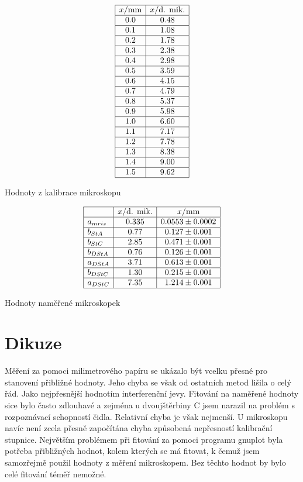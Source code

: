 \documentclass[a4paper,12pt]{article}
\begin{document}
\begin{table}
$$
\begin{array}{|c|c|}
\hline
x/\mbox{mm}& x/\mbox{d. mik.} \\ \hline
0.0&    0.48 \\ \hline
0.1&    1.08 \\ \hline
0.2&    1.78 \\ \hline
0.3&    2.38 \\ \hline
0.4&    2.98 \\ \hline
0.5&    3.59 \\ \hline
0.6&    4.15 \\ \hline
0.7&    4.79 \\ \hline
0.8&    5.37 \\ \hline
0.9&    5.98 \\ \hline
1.0&    6.60 \\ \hline
1.1&    7.17 \\ \hline
1.2&    7.78 \\ \hline
1.3&    8.38 \\ \hline
1.4&    9.00 \\ \hline
1.5&    9.62 \\ \hline
\end{array}
$$
\caption{Hodnoty z kalibrace mikroskopu}
\label{TMik}
\end{table}

\begin{table}
$$
\begin{array}{|l|c|c|}
\hline
&   x/\mbox{d. mik.}&   x/\mbox{mm} \\ \hline
a_{mriz}&   0.335&  0.0553 \pm 0.0002  \\ \hline
b_{StA}&    0.77&   0.127 \pm 0.001 \\ \hline
b_{StC}&    2.85&   0.471 \pm 0.001 \\ \hline
b_{DStA}&   0.76&   0.126 \pm 0.001 \\ \hline
a_{DStA}&   3.71&   0.613 \pm 0.001 \\ \hline
b_{DStC}&   1.30&   0.215 \pm 0.001 \\ \hline
a_{DStC}&   7.35&   1.214 \pm 0.001 \\ \hline
\end{array}
$$
\caption{Hodnoty naměřené mikroskopek}
\label{TMH}
\end{table}

\section{Dikuze}
Měření za pomoci milimetrového papíru se ukázalo být vcelku přesné pro stanovení 
přibližné hodnoty. Jeho chyba se však od ostatních metod lišila o celý řád. Jako 
nejpřesnější hodnotím interferenční jevy. Fitování na naměřené hodnoty sice bylo často 
zdlouhavé a zejména u dvoujštěrbiny C jsem narazil na problém s rozpoznávací schopností 
čidla. Relativní chyba je však nejmenší. U mikroskopu navíc není zcela přesně započítána 
chyba způsobená nepřesností kalibrační stupnice. Největším problémem při fitování 
za pomoci programu gnuplot byla potřeba přibližných hodnot, kolem kterých se má 
fitovat, k čemuž jsem samozřejmě použil hodnoty z měření mikroskopem. Bez těchto hodnot 
by bylo celé fitování téměř nemožné.
\end{document}
